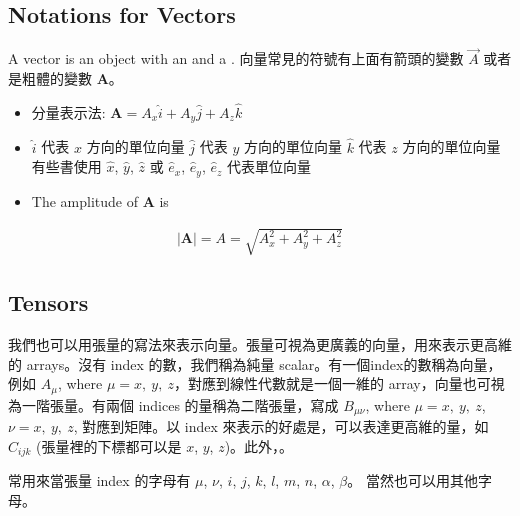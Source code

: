 \documentclass[letterpaper,10pt,english]{jupyterBook}
\begin{document}
\subsection{Notations for Vectors}
\label{\detokenize{va/vec_alge:notations-for-vectors}}
\sphinxAtStartPar
A vector is an object with an  and a .
向量常見的符號有上面有箭頭的變數 \(\vec{A}\) 或者是粗體的變數 \(\mathbf{A}\)。
\begin{itemize}
\item {} 
\sphinxAtStartPar
分量表示法:
\(\mathbf{A} = A_x \hat{i} + A_y \hat{j} + A_z \hat{k}\)

\item {} 
\sphinxAtStartPar
\(\hat{i}\) 代表 \(x\) 方向的單位向量
\(\hat{j}\) 代表 \(y\) 方向的單位向量
\(\hat{k}\) 代表 \(z\) 方向的單位向量
有些書使用 \(\hat{x}\), \(\hat{y}\), \(\hat{z}\) 或
\(\hat{e}_x\), \(\hat{e}_y\), \(\hat{e}_z\) 代表單位向量

\item {} 
\sphinxAtStartPar
The amplitude of \(\mathbf{A}\) is

\end{itemize}
\begin{equation*}
\begin{split}|\mathbf{A}| = A = \sqrt{A_x^2+A_y^2+A_z^2} \end{split}
\end{equation*}

\subsection{Tensors}
\label{\detokenize{va/vec_alge:tensors}}
\sphinxAtStartPar
我們也可以用張量的寫法來表示向量。張量可視為更廣義的向量，用來表示更高維的 arrays。沒有 index 的數，我們稱為純量 scalar。有一個index的數稱為向量，例如 \(A_\mu\), where \(\mu =x,~y,~z\)，對應到線性代數就是一個一維的 array，向量也可視為一階張量。有兩個 indices 的量稱為二階張量，寫成 \(B_{\mu\nu}\), where \(\mu =x,~y,~z\), \(\nu =x,~y,~z\), 對應到矩陣。以 index 來表示的好處是，可以表達更高維的量，如 \(C_{ijk}\) (張量裡的下標都可以是 \(x\), \(y\), \(z\))。此外，。

\sphinxAtStartPar
常用來當張量 index 的字母有 \(\mu\), \(\nu\), \(i\), \(j\), \(k\), \(l\), \(m\), \(n\), \(\alpha\), \(\beta\)。 當然也可以用其他字母。
\end{document}
